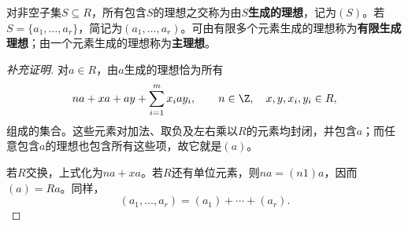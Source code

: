 \begin{definition}
对非空子集$S\subseteq R$，所有包含$S$的理想之交称为由$S$\textbf{生成的理想}，记为$(S)$。若$S=\{a_1,\ldots,a_r\}$，简记为$(a_1,\ldots,a_r)$。可由有限多个元素生成的理想称为\textbf{有限生成理想}；由一个元素生成的理想称为\textbf{主理想}。
\end{definition}
\begin{proof}[补充证明]
对$a\in R$，由$a$生成的理想恰为所有
\[
na+xa+ay+\sum_{i=1}^m x_iay_i,
\qquad n\in\Z,\quad x,y,x_i,y_i\in R,
\]
组成的集合。这些元素对加法、取负及左右乘以$R$的元素均封闭，并包含$a$；而任意包含$a$的理想也包含所有这些项，故它就是$(a)$。

若$R$交换，上式化为$na+xa$。若$R$还有单位元素，则$na=(n1)a$，因而$(a)=Ra$。同样，
\[
(a_1,\ldots,a_r)=(a_1)+\cdots+(a_r).
\]
\end{proof}
%
%
%
%
%
